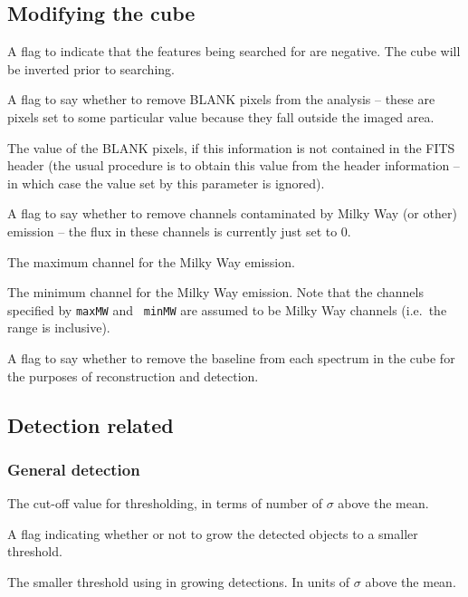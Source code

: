 \documentclass[12pt,a4paper]{article}
\newcommand{\ie}{i.e.\ }
\newcommand{\entrylabel}[1]{\mbox{\textsf{\bf{#1:}}}\hfil}
\newenvironment{entry}
        {\begin{list}{}%
                {\renewcommand{\makelabel}{\entrylabel}%
                        \setlength{\labelwidth}{30mm}%
                        \setlength{\labelsep}{5pt}%
                        \setlength{\itemsep}{2pt}%
                        \setlength{\parsep}{2pt}%
                        \setlength{\leftmargin}{35mm}%
                }%
        }%
{\end{list}}
\begin{document}
\subsection*{Modifying the cube}
\begin{entry}
\item[flagNegative {\tt [false]}] A flag to indicate that the features
  being searched for are negative. The cube will be inverted prior to
  searching. 
\item[flagBlankPix {\tt [true]}] A flag to say whether to remove BLANK
  pixels from the analysis -- these are pixels set to some particular
  value because they fall outside the imaged area.
\item[blankPixValue {\tt [-8.00061]}] The value of the BLANK pixels,
  if this information is not contained in the FITS header (the usual
  procedure is to obtain this value from the header information -- in
  which case the value set by this parameter is ignored).
\item[flagMW {\tt [false]}] A flag to say whether to remove channels
  contaminated by Milky Way (or other) emission -- the flux in these
  channels is currently just set to 0.
\item[maxMW {\tt [112]}] The maximum channel for the Milky Way
  emission.
\item[minMW {\tt [75]}] The minimum channel for the Milky Way
  emission. Note that the channels specified by {\tt maxMW} and {\tt
  minMW} are assumed to be Milky Way channels (\ie the range is
  inclusive).
\item[flagBaseline {\tt [false]}] A flag to say whether to remove the
  baseline from each spectrum in the cube for the purposes of
  reconstruction and detection.
\end{entry}

\subsection*{Detection related}

\subsubsection*{General detection}
\begin{entry}
\item[snrCut {\tt [3.]}] The cut-off value for thresholding, in terms
  of number of $\sigma$ above the mean.
\item[flagGrowth {\tt [true]}] A flag indicating whether or not to
  grow the detected objects to a smaller threshold.
\item[growthCut {\tt [1.5]}] The smaller threshold using in growing
  detections. In units of $\sigma$ above the mean.
\end{entry}
\end{document}
